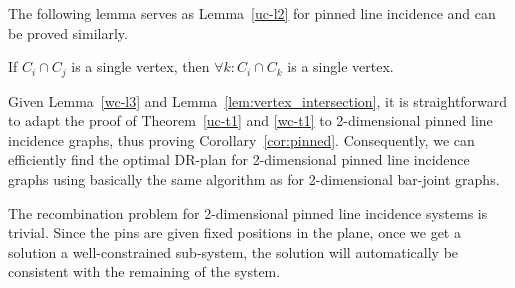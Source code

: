 
The following lemma serves as Lemma~\ref{uc-l2} for pinned line incidence and can be proved similarly.
\begin{lemma}
\label{lem:vertex_intersection}
If $C_i\cap C_j$ is a single vertex, then $\forall k: C_i\cap C_k$ is a single vertex.
\end{lemma}

Given Lemma~\ref{wc-l3} and Lemma~\ref{lem:vertex_intersection}, 
it is straightforward to adapt the proof of Theorem~\ref{uc-t1} and \ref{wc-t1} 
to  2-dimensional pinned line incidence graphs,
thus proving Corollary~\ref{cor:pinned}. 
Consequently, we can efficiently find the optimal DR-plan for 2-dimensional pinned line incidence graphs using basically the same algorithm as for 2-dimensional bar-joint graphs.

The recombination problem for 2-dimensional pinned line incidence systems is trivial. 
Since the pins are given fixed positions in the plane, 
once we get a solution a well-constrained sub-system, 
the solution will automatically be consistent with the remaining of the system. 
 
